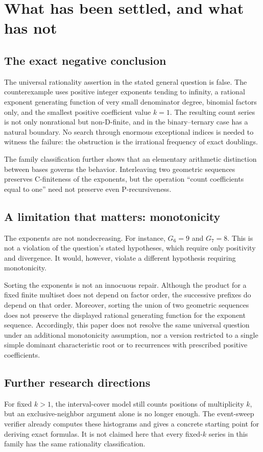 \documentclass[11pt,letterpaper]{article}
\numberwithin{equation}{section}
\theoremstyle{definition}
\theoremstyle{remark}
\begin{document}
\section{What has been settled, and what has not}\label{sec:scope}

\subsection{The exact negative conclusion}
The universal rationality assertion in the stated general question is false. The counterexample uses positive integer exponents tending to infinity, a rational exponent generating function of very small denominator degree, binomial factors only, and the smallest positive coefficient value $k=1$. The resulting count series is not only nonrational but non-D-finite, and in the binary--ternary case has a natural boundary. No search through enormous exceptional indices is needed to witness the failure: the obstruction is the irrational frequency of exact doublings.

The family classification further shows that an elementary arithmetic distinction between bases governs the behavior. Interleaving two geometric sequences preserves C-finiteness of the exponents, but the operation ``count coefficients equal to one'' need not preserve even P-recursiveness.

\subsection{A limitation that matters: monotonicity}
The exponents are not nondecreasing. For instance, $G_6=9$ and $G_7=8$. This is not a violation of the question's stated hypotheses, which require only positivity and divergence. It would, however, violate a different hypothesis requiring monotonicity.

Sorting the exponents is not an innocuous repair. Although the product for a fixed finite multiset does not depend on factor order, the successive prefixes do depend on that order. Moreover, sorting the union of two geometric sequences does not preserve the displayed rational generating function for the exponent sequence. Accordingly, this paper does not resolve the same universal question under an additional monotonicity assumption, nor a version restricted to a single simple dominant characteristic root or to recurrences with prescribed positive coefficients.

\subsection{Further research directions}
For fixed $k>1$, the interval-cover model still counts positions of multiplicity $k$, but an exclusive-neighbor argument alone is no longer enough. The event-sweep verifier already computes these histograms and gives a concrete starting point for deriving exact formulas. It is not claimed here that every fixed-$k$ series in this family has the same rationality classification.
\end{document}

